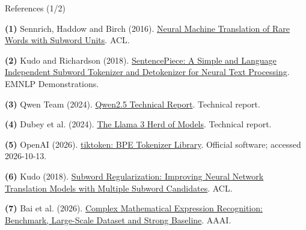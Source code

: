 \documentclass[11pt,aspectratio=43]{beamer}
\newcommand{\major}[1]{\renewcommand{\currentmajor}{#1}}
\begin{document}
\major{References}
\begin{frame}[t]{References (1/2)}
\relax
{\scriptsize \par\noindent\hypertarget{ref-bpe}{}\textbf{(1)} Sennrich, Haddow and Birch (2016). \href{https://aclanthology.org/P16-1162/}{Neural Machine Translation of Rare Words with Subword Units}. ACL.\par\vspace{14pt}
\par\noindent\hypertarget{ref-sentencepiece}{}\textbf{(2)} Kudo and Richardson (2018). \href{https://aclanthology.org/D18-2012/}{SentencePiece: A Simple and Language Independent Subword Tokenizer and Detokenizer for Neural Text Processing}. EMNLP Demonstrations.\par\vspace{14pt}
\par\noindent\hypertarget{ref-qwen}{}\textbf{(3)} Qwen Team (2024). \href{https://arxiv.org/abs/2412.15115}{Qwen2.5 Technical Report}. Technical report.\par\vspace{14pt}
\par\noindent\hypertarget{ref-llama}{}\textbf{(4)} Dubey et al. (2024). \href{https://arxiv.org/abs/2407.21783}{The Llama 3 Herd of Models}. Technical report.\par\vspace{14pt}
\par\noindent\hypertarget{ref-tiktoken}{}\textbf{(5)} OpenAI (2026). \href{https://github.com/openai/tiktoken}{tiktoken: BPE Tokenizer Library}. Official software; accessed 2026-10-13.\par\vspace{14pt}
\par\noindent\hypertarget{ref-unigram}{}\textbf{(6)} Kudo (2018). \href{https://aclanthology.org/P18-1007/}{Subword Regularization: Improving Neural Network Translation Models with Multiple Subword Candidates}. ACL.\par\vspace{14pt}
\par\noindent\hypertarget{ref-cmer}{}\textbf{(7)} Bai et al. (2026). \href{https://ojs.aaai.org/index.php/AAAI/article/view/37224}{Complex Mathematical Expression Recognition: Benchmark, Large-Scale Dataset and Strong Baseline}. AAAI.\par\vspace{14pt}}
\end{frame}
\end{document}
